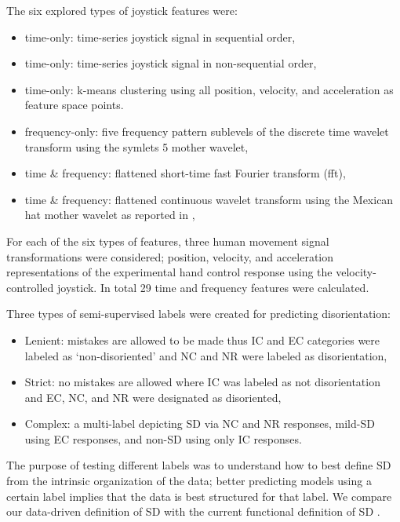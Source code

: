\documentclass{ieeeaccess}
\begin{document}
The six explored types of joystick features were:
\begin{itemize}
\item time-only: time-series joystick signal in sequential order,
\item time-only: time-series joystick signal in non-sequential order,
\item time-only: k-means clustering using all position, velocity, and acceleration as feature space points.
\item frequency-only: five frequency pattern sublevels of the discrete time wavelet transform using the symlets 5 mother wavelet\cite{Nedorubova_2021_CWT_CNN_HumanActivity},
\item time \& frequency: flattened short-time fast Fourier transform (fft),
\item time \& frequency: flattened continuous wavelet transform using the Mexican hat mother wavelet as reported in \cite{Nedorubova_2021_CWT_CNN_HumanActivity},
\end{itemize}
For each of the six types of features, three human movement signal transformations were considered; position, velocity, and acceleration representations of the experimental hand control response using the velocity-controlled joystick. In total 29 time and frequency features were calculated.

Three types of semi-supervised labels were created for predicting disorientation:
\begin{itemize}
\item Lenient: mistakes are allowed to be made thus IC and EC categories were labeled as ‘non-disoriented’ and NC and NR were labeled as disorientation,
\item Strict: no mistakes are allowed where IC was labeled as not disorientation and EC, NC, and NR were designated as disoriented,
\item Complex: a multi-label depicting SD via NC and NR responses, mild-SD using EC responses, and non-SD using only IC responses.
\end{itemize}
The purpose of testing different labels was to understand how to best define SD from the intrinsic organization of the data; better predicting models using a certain label implies that the data is best structured for that label. We compare our data-driven definition of SD with the current functional definition of SD \cite{Newman_2007_SD}.
\end{document}
